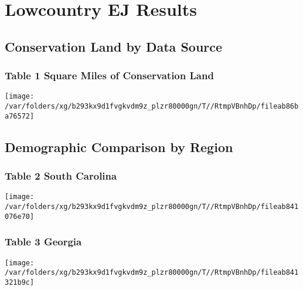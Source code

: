 \documentclass[landscape]{article}
\author{}
\date{\vspace{-2.5em}}
\begin{document}
\hypertarget{lowcountry-ej-results}{%
\section{Lowcountry EJ Results}\label{lowcountry-ej-results}}

\hypertarget{conservation-land-by-data-source}{%
\subsection{Conservation Land by Data
Source}\label{conservation-land-by-data-source}}

\hypertarget{table-1-square-miles-of-conservation-land}{%
\subsubsection{Table 1 Square Miles of Conservation
Land}\label{table-1-square-miles-of-conservation-land}}

\texttt{[image: /var/folders/xg/b293kx9d1fvgkvdm9z\_plzr80000gn/T//RtmpVBnhDp/fileab86ba76572]}

\hypertarget{demographic-comparison-by-region}{%
\subsection{Demographic Comparison by
Region}\label{demographic-comparison-by-region}}

\hypertarget{table-2-south-carolina}{%
\subsubsection{Table 2 South Carolina}\label{table-2-south-carolina}}

\texttt{[image: /var/folders/xg/b293kx9d1fvgkvdm9z\_plzr80000gn/T//RtmpVBnhDp/fileab841076e70]}

\hypertarget{table-3-georgia}{%
\subsubsection{Table 3 Georgia}\label{table-3-georgia}}

\texttt{[image: /var/folders/xg/b293kx9d1fvgkvdm9z\_plzr80000gn/T//RtmpVBnhDp/fileab841321b9c]}
\end{document}
